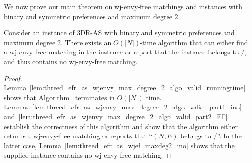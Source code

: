 We now prove our main theorem on wj-envy-free matchings and instances with binary and symmetric preferences and maximum degree $2$.

\begin{thm}
\label{thm:threed_efr_as_wjef_algowjpathscycles}
Consider an instance of 3DR-AS with binary and symmetric preferences and maximum degree $2$. There exists an $O(|N|)$-time algorithm that can either find a wj-envy-free matching in the instance or report that the instance belongs to \iwjnomaxdegreetwofamily/, and thus contains no wj-envy-free matching.
\end{thm}
\begin{proof}
Lemma~\ref{lem:threed_efr_as_wjenvy_max_degree_2_algo_valid_runningtime} shows that Algorithm~ terminates in $O(|N|)$ time. Lemmas~\ref{lem:threed_efr_as_wjenvy_max_degree_2_algo_valid_part1_ino} and~\ref{lem:threed_efr_as_wjenvy_max_degree_2_algo_valid_part2_EF} establish the correctness of this algorithm and show that the algorithm either returns a wj-envy-free matching or reports that ``$(N, E)$ belongs to \iwjnomaxdegreetwofamily/''. In the latter case, Lemma~\ref{lem:threed_efr_as_wjef_maxdeg2_ino} shows that the supplied instance contains no wj-envy-free matching.
\end{proof}

